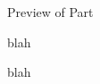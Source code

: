\begin{frame}{Preview of Part \nextpart}

\begin{itemize}
{\small
\item blah
\item blah
}
\end{itemize}

\end{frame}

